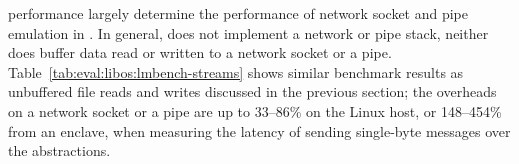 \label{sec:eval:libos:streams}


\begin{table}[t!b!]

\caption{Network socket and pipe performance based on \lmbench{}. Comparison is among (1) native Linux processes; (2) \graphene{} on Linux host, both without and with \seccomp{} filter ({\bf +SC}) and reference monitor ({\bf +RM}); (3) \graphenesgx{}.
System call latency is in microseconds, and lower is better.
System call bandwidth is in megabytes per second, and higher is better. 
Overheads are relative to Linux; negative overheads indicate improvement.} 
\label{tab:eval:libos:lmbench-streams}
\end{table}


\Thehostabi{} performance
largely determine
the performance of network socket and pipe emulation
in \thelibos{}.
In general, \thelibos{} does not implement a network or pipe stack,
neither does \thelibos{}
buffer data read or written to a network socket or a pipe.
Table~\ref{tab:eval:libos:lmbench-streams} shows similar benchmark results as
unbuffered file reads and writes discussed in the previous section;
the overheads on a network socket or a pipe are up to 33--86\% on the Linux host,
or 148--454\% from an enclave,
when measuring the latency of sending single-byte messages
over the abstractions.
 

